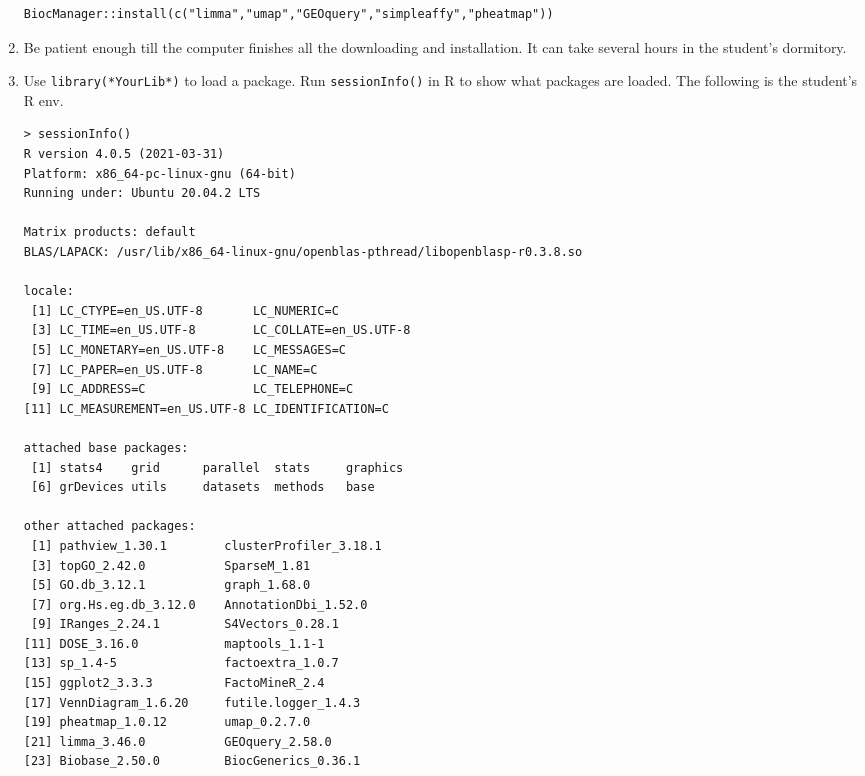 \documentclass[en,black,12pt,normal]{elegantnote}
\begin{document}
\begin{enumerate}
    \begin{lstlisting}
BiocManager::install(c("limma","umap","GEOquery","simpleaffy","pheatmap"))
    \end{lstlisting}
    \item Be patient enough till the computer finishes all the downloading and installation. It can take several hours in the student's dormitory.
    \item Use \lstinline{library(*YourLib*)} to load a package. Run \lstinline{sessionInfo()} in R to show what packages are loaded. The following is the student's R env.
    
    \begin{lstlisting}
> sessionInfo()
R version 4.0.5 (2021-03-31)
Platform: x86_64-pc-linux-gnu (64-bit)
Running under: Ubuntu 20.04.2 LTS

Matrix products: default
BLAS/LAPACK: /usr/lib/x86_64-linux-gnu/openblas-pthread/libopenblasp-r0.3.8.so

locale:
 [1] LC_CTYPE=en_US.UTF-8       LC_NUMERIC=C              
 [3] LC_TIME=en_US.UTF-8        LC_COLLATE=en_US.UTF-8    
 [5] LC_MONETARY=en_US.UTF-8    LC_MESSAGES=C             
 [7] LC_PAPER=en_US.UTF-8       LC_NAME=C                 
 [9] LC_ADDRESS=C               LC_TELEPHONE=C            
[11] LC_MEASUREMENT=en_US.UTF-8 LC_IDENTIFICATION=C       

attached base packages:
 [1] stats4    grid      parallel  stats     graphics 
 [6] grDevices utils     datasets  methods   base     

other attached packages:
 [1] pathview_1.30.1        clusterProfiler_3.18.1
 [3] topGO_2.42.0           SparseM_1.81          
 [5] GO.db_3.12.1           graph_1.68.0          
 [7] org.Hs.eg.db_3.12.0    AnnotationDbi_1.52.0  
 [9] IRanges_2.24.1         S4Vectors_0.28.1      
[11] DOSE_3.16.0            maptools_1.1-1        
[13] sp_1.4-5               factoextra_1.0.7      
[15] ggplot2_3.3.3          FactoMineR_2.4        
[17] VennDiagram_1.6.20     futile.logger_1.4.3   
[19] pheatmap_1.0.12        umap_0.2.7.0          
[21] limma_3.46.0           GEOquery_2.58.0       
[23] Biobase_2.50.0         BiocGenerics_0.36.1   


\end{lstlisting}
\end{enumerate}
\end{document}
